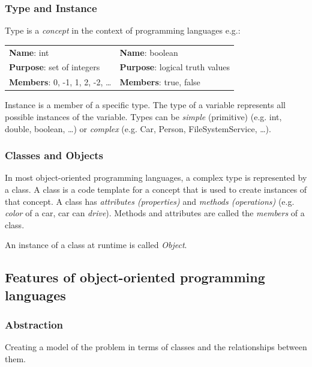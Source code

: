 \subsubsection*{Type and Instance}
Type is a \textit{concept} in the context of programming languages e.g.:
\begin{center}
	\begin{tabular}{ll}
		\textbf{Name}: int & \textbf{Name}: boolean \\
		\textbf{Purpose}: set of integers & \textbf{Purpose}: logical truth values \\
		\textbf{Members}: 0, -1, 1, 2, -2, \dots & \textbf{Members}: true, false \\
	\end{tabular}
\end{center}

Instance is a member of a specific type.
The type of a variable represents all possible instances of the variable.
Types can be \textit{simple} (primitive) (e.g. int, double, boolean, \dots) or \textit{complex} (e.g. Car, Person, FileSystemService, \dots).

\subsubsection*{Classes and Objects}
In most object-oriented programming languages, a complex type is represented by a class.
A class is a code template for a concept that is used to create instances of that concept.
A class has \textit{attributes (properties)} and \textit{methods (operations)} (e.g. \textit{color} of a car, car can \textit{drive}).
Methods and attributes are called the \textit{members} of a class.\newline

An instance of a class at runtime is called \textit{Object}.


\subsection{Features of object-oriented programming languages}
\subsubsection*{Abstraction}
Creating a model of the problem in terms of classes and the relationships between them.


